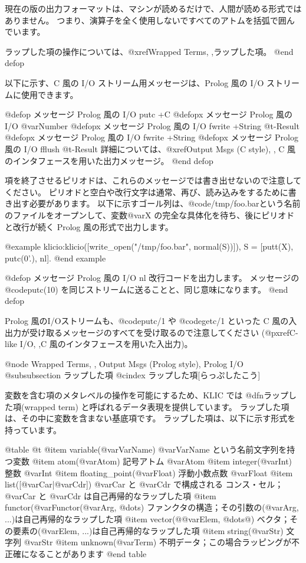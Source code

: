 {{{{現在の版の出力フォーマットは、マシンが読めるだけで、人間が読める形式ではありません。
つまり、演算子を全く使用しないですべてのアトムを括弧で囲んでいます。

ラップした項の操作については、@xref{Wrapped Terms, ,ラップした項}。
@end defop

以下に示す、C 風の I/O ストリーム用メッセージは、Prolog 風の I/O ストリームに使用できます。

@defop {メッセージ} {Prolog 風の I/O }  putc +C
@defopx {メッセージ} {Prolog 風の I/O }  @var{Number}
@defopx {メッセージ} {Prolog 風の I/O }  fwrite +String @t{-}Result
@defopx {メッセージ} {Prolog 風の I/O }  fwrite +String
@defopx {メッセージ} {Prolog 風の I/O }  fflush @t{-}Result
詳細については、@xref{Output Msgs (C style), ,
C 風のインタフェースを用いた出力メッセージ}。
@end defop

項を終了させるピリオドは、これらのメッセージでは書き出せないので注意してください。
ピリオドと空白や改行文字は通常、再び、読み込みをするために書き出す必要があります。
以下に示すゴール列は、@code{/tmp/foo.bar}という名前のファイルをオープンして、変数@var{X} の完全な具体化を待ち、後にピリオドと改行が続く Prolog 風の形式で出力します。

@example
klicio:klicio([write_open("/tmp/foo.bar", normal(S))]),
S = [putt(X), putc(0'.), nl].
@end example

@defop {メッセージ} {Prolog 風の I/O }  nl
改行コードを出力します。
メッセージの @code{putc(10)} を同じストリームに送ることと、同じ意味になります。
@end defop

Prolog 風のI/Oストリームも、@code{putc/1} や @code{getc/1} といった C 風の入出力が受け取るメッセージのすべてを受け取るので注意してください
(@pxref{C-like I/O, ,C 風のインタフェースを用いた入出力})。

@node Wrapped Terms,  , Output Msgs (Prolog style), Prolog I/O
@subsubsection ラップした項
@cindex ラップした項[らっぷしたこう]

変数を含む項のメタレベルの操作を可能にするため、KLIC では @dfn{ラップした項(wrapped term)} と呼ばれるデータ表現を提供しています。
ラップした項は、その中に変数を含まない基底項です。
ラップした項は、以下に示す形式を持っています。

@table @t
@item variable(@var{VarName})
@var{VarName} という名前文字列を持つ変数
@item atom(@var{Atom})
記号アトム @var{Atom}
@item integer(@var{Int})
整数 @var{Int}
@item floating_point(@var{Float})
浮動小数点数 @var{Float}
@item list([@var{Car}|@var{Cdr}])
@var{Car} と @var{Cdr} で構成される コンス・セル；@var{Car} と @var{Cdr} は自己再帰的なラップした項
@item functor(@var{Functor}(@var{Arg}, @dots{})
ファンクタの構造；その引数の(@var{Arg}, ...)は自己再帰的なラップした項
@item vector(@{@var{Elem}, @dots{}@})
ベクタ；その要素の(@var{Elem}, ...)は自己再帰的なラップした項
@item string(@var{Str})
文字列 @var{Str}
@item unknown(@var{Term})
不明データ；この場合ラッピングが不正確になることがあります
@end table

}}}}
